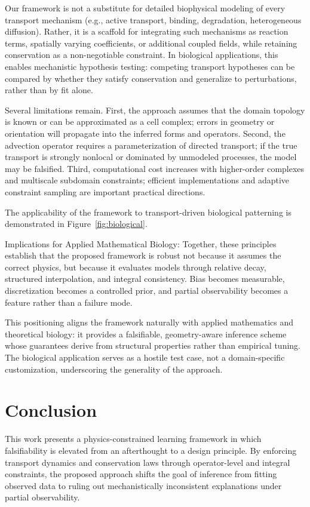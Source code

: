 \documentclass[10pt,article]{article}
\begin{document}
Our framework is not a substitute for detailed biophysical modeling of every transport mechanism (e.g., active transport, binding, degradation, heterogeneous diffusion). Rather, it is a scaffold for integrating such mechanisms as reaction terms, spatially varying coefficients, or additional coupled fields, while retaining conservation as a non-negotiable constraint. In biological applications, this enables mechanistic hypothesis testing: competing transport hypotheses can be compared by whether they satisfy conservation and generalize to perturbations, rather than by fit alone.

Several limitations remain. First, the approach assumes that the domain topology is known or can be approximated as a cell complex; errors in geometry or orientation will propagate into the inferred forms and operators. Second, the advection operator requires a parameterization of directed transport; if the true transport is strongly nonlocal or dominated by unmodeled processes, the model may be falsified. Third, computational cost increases with higher-order complexes and multiscale subdomain constraints; efficient implementations and adaptive constraint sampling are important practical directions.

The applicability of the framework to transport-driven biological patterning is demonstrated in Figure~\ref{fig:biological}.

Implications for Applied Mathematical Biology:
Together, these principles establish that the proposed framework is robust not because it assumes the correct physics, but because it evaluates models through relative decay, structured interpolation, and integral consistency. Bias becomes measurable, discretization becomes a controlled prior, and partial observability becomes a feature rather than a failure mode.

This positioning aligns the framework naturally with applied mathematics and theoretical biology: it provides a falsifiable, geometry-aware inference scheme whose guarantees derive from structural properties rather than empirical tuning. The biological application serves as a hostile test case, not a domain-specific customization, underscoring the generality of the approach.

\section{Conclusion}
This work presents a physics-constrained learning framework in which falsifiability is elevated from an afterthought to a design principle. By enforcing transport dynamics and conservation laws through operator-level and integral constraints, the proposed approach shifts the goal of inference from fitting observed data to ruling out mechanistically inconsistent explanations under partial observability.
\end{document}
